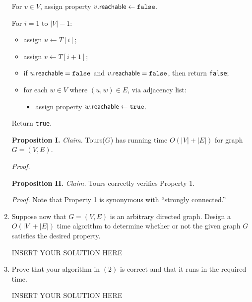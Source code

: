 \begin{enumerate}
\begin{solution}
For $v\in V$, assign property $v.\mathsf{reachable}\leftarrow\verb|false|$.

For $i=1$ to $|V|-1$:
\begin{itemize}
    \item assign $u\leftarrow T[i]$;
    \item assign $v\leftarrow T[i+1]$;
    \item if $u.\mathsf{reachable}=\verb|false|$ and $v.\mathsf{reachable}=\verb|false|$, then return \verb|false|;
    \item for each $w\in V$ where $(u,w)\in E$, via adjacency list:
    \begin{itemize}
    \item assign property $w.\mathsf{reachable}\leftarrow \verb|true|$.
    \end{itemize}
\end{itemize}
Return \verb|true|.

\textbf{Proposition I. }\textit{Claim. }{\sc Tours}($G$) has running time $O(|V|+|E|)$ for graph $G=(V,E)$.

\textit{Proof. }

\textbf{Proposition II. }\textit{Claim. }{\sc Tours} correctly verifies Property 1.

\textit{Proof. }Note that Property 1 is synonymous with ``strongly connected.''
\end{solution}

\item Suppose now that $G = (V, E)$ is an arbitrary directed graph. Design a $O(|V|+|E|)$ time algorithm to determine whether or not the given graph $G$ satisfies the desired property. 

\begin{solution}   INSERT YOUR SOLUTION HERE   \end{solution}


\item Prove that your algorithm in $(2)$ is correct and that it runs in the required time.
\begin{solution}   INSERT YOUR SOLUTION HERE   \end{solution}
\end{enumerate}
\newpage
